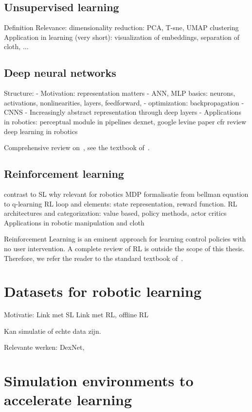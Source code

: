 \documentclass[\home/main.tex]{subfiles}
\begin{document}
\subsection{Unsupervised learning}
Definition
Relevance:
	 dimensionality reduction: PCA, T-sne, UMAP 
	 clustering 
Application in learning (very short): visualization of embeddings, separation of cloth, ... 


\subsection{Deep neural networks} \label{subsec:lit_dnn}
Structure: 
	- Motivation: representation matters
	- ANN, MLP basics: neurons, activations, nonlinearities, layers, feedforward, 
	- optimization: backpropagation 
	- CNNS
	- Increasingly abstract representation through deep layers 
	- Applications in robotics:
		perceptual module in pipelines
		dexnet, google levine paper
		cfr review deep learning in robotics 

Comprehensive review on~, see the textbook of~\textcite{Goodfellow2016}.

\subsection{Reinforcement learning} \label{subsec:lit_rl}
contrast to SL 
why relevant for robotics
MDP formalisatie
from bellman equation to q-learning 
RL loop and elements: state representation, reward function. 
RL architectures and categorization: value based, policy methods, actor critics 
Applications in robotic manipulation and cloth 

Reinforcement Learning is an eminent approach for learning control policies with no user intervention. A complete review of RL is outside the scope of this thesis. Therefore, we refer the reader to the standard textbook of~\textcite{Sutton2018}.

\section{Datasets for robotic learning} \label{sec:lit_datasets}
Motivatie:
	Link met SL
	Link met RL, offline RL 

Kan simulatie of echte data zijn. 

Relevante werken:
	DexNet, 

\section{Simulation environments to accelerate learning} \label{sec:lit_simulation}
\end{document}
